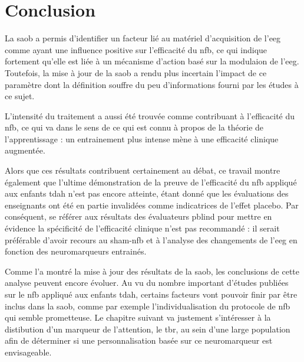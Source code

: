 
\section{Conclusion}

La \gls{saob} a permis d'identifier un facteur lié au matériel d'acquisition de l'\gls{eeg} comme ayant une influence positive sur l'efficacité du \gls{nfb}, 
ce qui indique fortement qu'elle est liée à un mécanisme d'action basé sur la modulaion de l'\gls{eeg}. Toutefois, la mise à jour de la \gls{saob} a rendu
plus incertain l'impact de ce paramètre dont la définition souffre du peu d'informations fourni par les études à ce sujet. 

L'intensité du traitement a aussi été trouvée comme contribuant à l'efficacité du \gls{nfb}, ce qui va dans le sens de ce qui est connu à propos de 
la théorie de l'apprentissage \citep{Mowrer1960} : un entrainement plus intense mène à une efficacité clinique augmentée. 

Alors que ces résultats contribuent certainement au débat, ce travail montre également que l'ultime démonstration de la preuve de l'efficacité du \gls{nfb}
appliqué aux enfants \gls{tdah} n'est pas encore atteinte, étant donné que les évaluations des enseignants ont été en partie invalidées comme indicatrices de 
l'effet placebo. Par conséquent, se référer aux résultats des évaluateurs \gls{pblind} pour mettre en évidence la spécificité de l'efficacité clinique n'est pas 
recommandé : il serait préférable d'avoir recours au sham-\gls{nfb} et à l'analyse des changements de l'\gls{eeg} en fonction des neuromarqueurs entrainés.

Comme l'a montré la mise à jour des résultats de la \gls{saob}, les conclusions de cette analyse peuvent encore évoluer. Au vu du nombre important 
d'études publiées sur le \gls{nfb} appliqué aux enfants \gls{tdah}, certains facteurs vont pouvoir finir par être inclus dans la \gls{saob}, comme par exemple 
l'individualisation du protocole de \gls{nfb} qui semble prometteuse. Le chapitre suivant va justement s'intéresser à la distibution d'un marqueur de l'attention, 
le \gls{tbr}, au sein d'une large population afin de déterminer si une personnalisation basée sur ce neuromarqueur est envisageable.




 